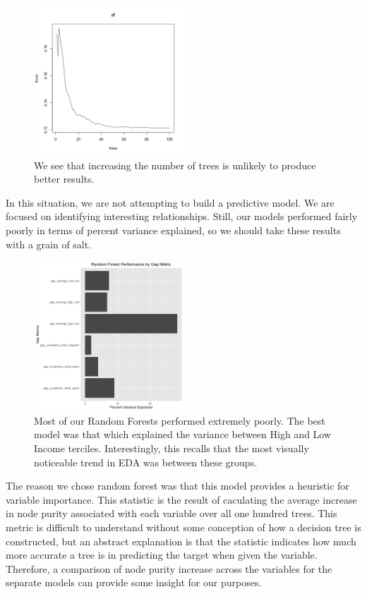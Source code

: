 \documentclass{article}
\begin{document}
\begin{figure}[H]
\centering
\includegraphics[width=0.5\textwidth]{../images/rf_treesgap_completion_white_black.png}
\caption{\label{fig: WBRFerror} We see that increasing the number of trees is unlikely to produce better results.}
\end{figure}

In this situation, we are not attempting to build a predictive model. We are focused on identifying interesting relationships. Still, our models performed fairly poorly in terms of percent variance explained, so we should take these results with a grain of salt.

\begin{figure}[H]
\centering
\includegraphics[width=0.5\textwidth]{../images/rf_performance.png}
\caption{\label{fig: CompletionRatesCohorts} Most of our Random Forests performed extremely poorly. The best model was that which explained the variance between High and Low Income terciles. Interestingly, this recalls that the most visually noticeable trend in EDA was between these groups.}
\end{figure}

The reason we chose random forest was that this model provides a heuristic for variable importance. This statistic is the result of caculating the average increase in node purity associated with each variable over all one hundred trees. This metric is difficult to understand without some conception of how a decision tree is constructed, but an abstract explanation is that the statistic indicates how much more accurate a tree is in predicting the target when given the variable. Therefore, a comparison of node purity increase across the variables for the separate models can provide some insight for our purposes.
\end{document}
